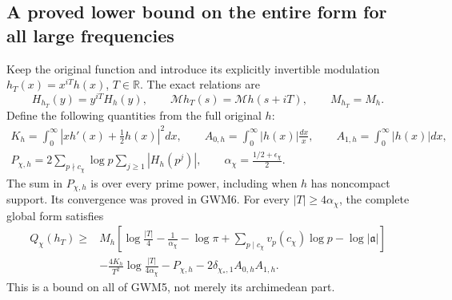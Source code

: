 \subsection{A proved lower bound on the entire form for all large frequencies}

Keep the original function and introduce its explicitly invertible
modulation $h_T(x)=x^{iT}h(x)$, $T\in\mathbb R$. The exact relations are
\begin{equation}\tag{GWM9}
 H_{h_T}(y)=y^{iT}H_h(y),\qquad
 \mathcal Mh_T(s)=\mathcal Mh(s+iT),\qquad M_{h_T}=M_h.
\end{equation}
Define the following quantities from the full original $h$:
\begin{equation}\tag{GWM10}
 \begin{gathered}
 K_h=\int_0^\infty|xh'(x)+\tfrac12h(x)|^2dx,\qquad
 A_{0,h}=\int_0^\infty|h(x)|\frac{dx}{x},\qquad
 A_{1,h}=\int_0^\infty|h(x)|dx,\\
 P_{\chi,h}=2\sum_{p\nmid c_\chi}\log p\sum_{j\ge1}|H_h(p^j)|,
 \qquad\alpha_\chi=\frac{1/2+\epsilon_\chi}{2}.
 \end{gathered}
\end{equation}
The sum in $P_{\chi,h}$ is over every prime power, including when $h$
has noncompact support. Its convergence was proved in GWM6. For every
$|T|\ge4\alpha_\chi$, the complete global form satisfies
\begin{equation}\tag{GWM11}
 \begin{split}
 Q_\chi(h_T)\ge{}&M_h\left[
 \log\frac{|T|}{4}-\frac1{\alpha_\chi}-\log\pi
 +\sum_{p\mid c_\chi}v_p(c_\chi)\log p-\log|\mathfrak a|\right]\\
 &-\frac{4K_h}{T^2}\log\frac{|T|}{4\alpha_\chi}
 -P_{\chi,h}-2\delta_{\chi_*,1}A_{0,h}A_{1,h}.
 \end{split}
\end{equation}
This is a bound on all of GWM5, not merely its archimedean part.

